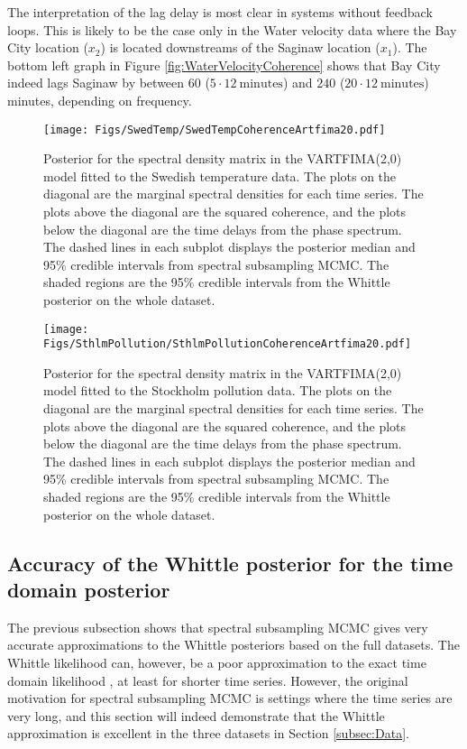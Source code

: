 \documentclass[11pt,english,oneside]{amsart}
\numberwithin{equation}{section}
\theoremstyle{plain}
\numberwithin{equation}{section}
\begin{document}
The interpretation of the lag delay is most clear in systems without feedback loops. This is likely to be the case only in the Water velocity data where the Bay City location ($x_2$) is located downstreams of the Saginaw location ($x_1$). The bottom left graph in Figure \ref{fig:WaterVelocityCoherence} shows that Bay City indeed lags Saginaw by between $60$ ($5\cdot 12~\mathrm{minutes}$) and $240$ ($20\cdot 12~\mathrm{minutes}$) minutes, depending on frequency.

\begin{figure}
    \texttt{[image: Figs/SwedTemp/SwedTempCoherenceArtfima20.pdf]}
    \caption{Posterior for the spectral density matrix in the VARTFIMA(2,0) model fitted to the Swedish temperature data. The plots on the diagonal are the marginal spectral densities for each time series. The plots above the diagonal are the squared coherence, and the plots below the diagonal are the time delays from the phase spectrum. The dashed lines in each subplot displays the posterior median and 95\% credible intervals from spectral subsampling MCMC. The shaded regions are the 95\% credible intervals from the Whittle posterior on the whole dataset.}\label{fig:SwedTempCoherence}
\end{figure}

\begin{figure}
    \texttt{[image: Figs/SthlmPollution/SthlmPollutionCoherenceArtfima20.pdf]}
    \caption{Posterior for the spectral density matrix in the VARTFIMA(2,0) model fitted to the Stockholm pollution data. The plots on the diagonal are the marginal spectral densities for each time series. The plots above the diagonal are the squared coherence, and the plots below the diagonal are the time delays from the phase spectrum. The dashed lines in each subplot displays the posterior median and 95\% credible intervals from spectral subsampling MCMC. The shaded regions are the 95\% credible intervals from the Whittle posterior on the whole dataset.}\label{fig:SthlmPollutionCoherence}
\end{figure}



\subsection{Accuracy of the Whittle posterior for the time domain posterior}
The previous subsection shows that spectral subsampling MCMC gives very accurate approximations to the Whittle posteriors based on the full datasets. The Whittle likelihood can, however, be a poor approximation to the exact time domain likelihood \citep{contreras2006note}, at least for shorter time series. However, the original motivation for spectral subsampling MCMC is settings where the time series are very long, and this section will indeed demonstrate that the Whittle approximation is excellent in the three datasets in Section \ref{subsec:Data}.
\end{document}
